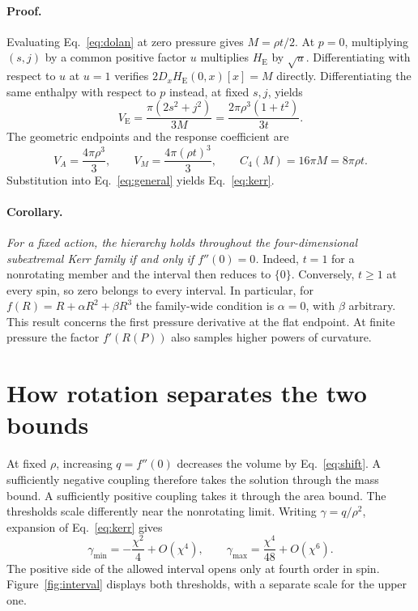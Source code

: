 \documentclass[11pt,a4paper]{article}
\newcommand{\VE}{V_{\mathrm E}}
\newcommand{\HE}{H_{\mathrm E}}
\begin{document}
\paragraph{Proof.}
Evaluating Eq.~\eqref{eq:dolan} at zero pressure gives \(M=\rho t/2\). At \(p=0\), multiplying \((s,j)\) by a common positive factor \(u\) multiplies \(\HE\) by \(\sqrt{u}\). Differentiating with respect to \(u\) at \(u=1\) verifies \(2D_x\HE(0,x)[x]=M\) directly. Differentiating the same enthalpy with respect to \(p\) instead, at fixed \(s,j\), yields
\begin{equation}\label{eq:VE}
 \VE=\frac{\pi(2s^2+j^2)}{3M}
     =\frac{2\pi\rho^3(1+t^2)}{3t}.
\end{equation}
The geometric endpoints and the response coefficient are
\begin{equation}\label{eq:kerrvol}
 V_A=\frac{4\pi\rho^3}{3},\qquad
 V_M=\frac{4\pi(\rho t)^3}{3},\qquad
 C_4(M)=16\pi M=8\pi\rho t .
\end{equation}
Substitution into Eq.~\eqref{eq:general} yields Eq.~\eqref{eq:kerr}. \hfill\qedsymbol

\paragraph{Corollary.}
\emph{For a fixed action, the hierarchy holds throughout the four-dimensional subextremal Kerr family if and only if \(f''(0)=0\).}
Indeed, \(t=1\) for a nonrotating member and the interval then reduces to \(\{0\}\). Conversely, \(t\geq1\) at every spin, so zero belongs to every interval. In particular, for \(f(R)=R+\alpha R^2+\beta R^3\) the family-wide condition is \(\alpha=0\), with \(\beta\) arbitrary. This result concerns the first pressure derivative at the flat endpoint. At finite pressure the factor \(f'(R(P))\) also samples higher powers of curvature.

\newpage
\section{How rotation separates the two bounds}
At fixed \(\rho\), increasing \(q=f''(0)\) decreases the volume by Eq.~\eqref{eq:shift}. A sufficiently negative coupling therefore takes the solution through the mass bound. A sufficiently positive coupling takes it through the area bound. The thresholds scale differently near the nonrotating limit. Writing \(\gamma=q/\rho^2\), expansion of Eq.~\eqref{eq:kerr} gives
\begin{equation}\label{eq:slow}
 \gamma_{\min}=-\frac{\chi^2}{4}+O(\chi^4),\qquad
 \gamma_{\max}=\frac{\chi^4}{48}+O(\chi^6).
\end{equation}
The positive side of the allowed interval opens only at fourth order in spin. Figure~\ref{fig:interval} displays both thresholds, with a separate scale for the upper one.
\end{document}
